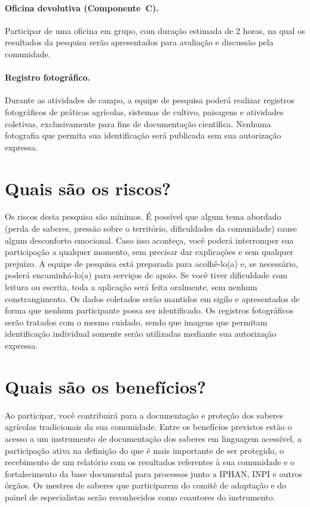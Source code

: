 \documentclass[12pt,a4paper,brazil]{article}
\begin{document}
\paragraph{Oficina devolutiva (Componente~C).} Participar de uma oficina em grupo, com duração estimada de 2 horas, na qual os resultados da pesquisa serão apresentados para avaliação e discussão pela comunidade.

\paragraph{Registro fotográfico.} Durante as atividades de campo, a equipe de pesquisa poderá realizar registros fotográficos de práticas agrícolas, sistemas de cultivo, paisagens e atividades coletivas, exclusivamente para fins de documentação científica. Nenhuma fotografia que permita sua identificação será publicada sem sua autorização expressa.

\section*{Quais são os riscos?}

Os riscos desta pesquisa são mínimos. É possível que algum tema abordado (perda de saberes, pressão sobre o território, dificuldades da comunidade) cause algum desconforto emocional. Caso isso aconteça, você poderá interromper sua participação a qualquer momento, sem precisar dar explicações e sem qualquer prejuízo. A equipe de pesquisa está preparada para acolhê-lo(a) e, se necessário, poderá encaminhá-lo(a) para serviços de apoio. Se você tiver dificuldade com leitura ou escrita, toda a aplicação será feita oralmente, sem nenhum constrangimento. Os dados coletados serão mantidos em sigilo e apresentados de forma que nenhum participante possa ser identificado. Os registros fotográficos serão tratados com o mesmo cuidado, sendo que imagens que permitam identificação individual somente serão utilizadas mediante sua autorização expressa.

\section*{Quais são os benefícios?}

Ao participar, você contribuirá para a documentação e proteção dos saberes agrícolas tradicionais da sua comunidade. Entre os benefícios previstos estão o acesso a um instrumento de documentação dos saberes em linguagem acessível, a participação ativa na definição do que é mais importante de ser protegido, o recebimento de um relatório com os resultados referentes à sua comunidade e o fortalecimento da base documental para processos junto a IPHAN, INPI e outros órgãos. Os mestres de saberes que participarem do comitê de adaptação e do painel de especialistas serão reconhecidos como coautores do instrumento.
\end{document}
